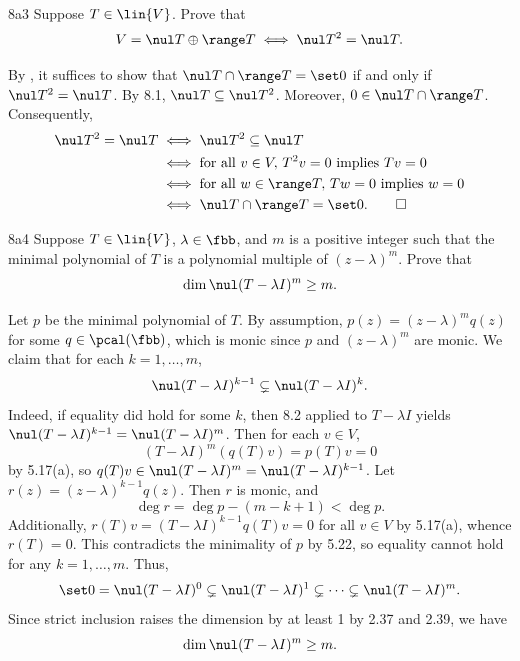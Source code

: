 \begin{exercise}{8a3}
    Suppose $T \in \lin{V}$.
    Prove that
    \[
        V = \nul T \oplus \range T \iff \nul T^2 = \nul T.
    \]
\end{exercise}

\begin{sol}
    By , it suffices to show that $\nul T \cap \range T = \set 0$ if and only if $\nul T^2 = \nul T$.
    By 8.1, $\nul T \subseteq \nul T^2$.
    Moreover, $0 \in \nul T \cap \range T$.
    Consequently,
    \begin{align*}
        \nul T^2 = \nul T &\iff \nul T^2 \subseteq \nul T \\
        &\iff \text{for all } v \in V,\,T^2 v = 0 \text{ implies } T v = 0 \\
        &\iff \text{for all } w \in \range T,\,Tw = 0 \text{ implies } w = 0 \\
        &\iff \nul T \cap \range T = \set 0. \qedhere
    \end{align*}
\end{sol}

\begin{exercise}{8a4}
    Suppose $T \in \lin{V}$, $\lambda \in \fbb$, and $m$ is a positive integer such that the minimal polynomial of $T$ is a polynomial multiple of $(z - \lambda)^m$.
    Prove that
    \[
        \dim \nul(T - \lambda I)^m \geq m.
    \]
\end{exercise}

\begin{sol}
    Let $p$ be the minimal polynomial of $T$.
    By assumption, $p(z) = (z - \lambda)^m q(z)$ for some $q \in \pcal(\fbb)$, which is monic since $p$ and $(z - \lambda)^m$ are monic.
    We claim that for each $k = 1, \ldots, m$,
    \[
        \nul(T - \lambda I)^{k-1} \subsetneq \nul(T - \lambda I)^k.
    \]
    Indeed, if equality did hold for some $k$, then 8.2 applied to $T - \lambda I$ yields $\nul(T - \lambda I)^{k-1} = \nul(T - \lambda I)^m$.
    Then for each $v \in V$,
    \[
        (T - \lambda I)^m(q(T)v) = p(T)v = 0
    \]
    by 5.17(a), so $q(T) v \in \nul(T - \lambda I)^m = \nul(T - \lambda I)^{k-1}$.
    Let $r(z) = (z - \lambda)^{k-1} q(z)$.
    Then $r$ is monic, and
    \[
        \deg r = \deg p - (m - k + 1) < \deg p.
    \]
    Additionally, $r(T)v = (T - \lambda I)^{k-1} q(T)v = 0$ for all $v \in V$ by 5.17(a), whence $r(T) = 0$.
    This contradicts the minimality of $p$ by 5.22, so equality cannot hold for any $k = 1, \ldots, m$.
    Thus,
    \[
        \set 0 = \nul(T - \lambda I)^0 \subsetneq \nul(T - \lambda I)^1 \subsetneq \cdots \subsetneq \nul(T - \lambda I)^m.
    \]
    Since strict inclusion raises the dimension by at least 1 by 2.37 and 2.39, we have
    \[
        \dim \nul(T - \lambda I)^m \geq m.
    \]
\end{sol}

